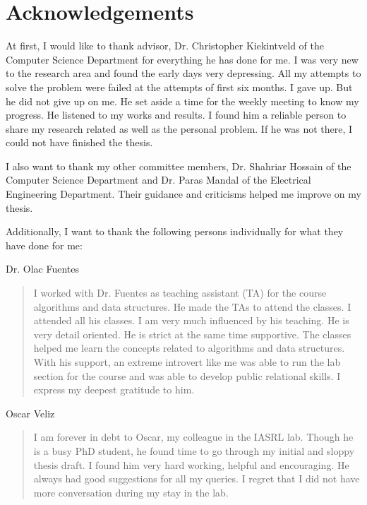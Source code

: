 

\chapter*{Acknowledgements}

At first, I would like to thank advisor, Dr. Christopher Kiekintveld of the Computer Science Department for everything he has done for me. I was very new to the research area and found the early days very depressing. All my attempts to solve the problem were failed at the attempts of first six months. I gave up. But he did not give up on me. He set aside a time for the weekly meeting to know my progress. He listened to my works and results. I found him a reliable person to share my research related as well as the personal problem. If he was not there, I could not have finished the thesis. 

I also want to thank my other committee members, Dr. Shahriar Hossain of 
the Computer Science Department and Dr. Paras Mandal of the Electrical Engineering Department. Their guidance and criticisms helped me improve on my thesis.

Additionally, I want to thank the following persons individually for what they have done for me:

\bigskip

\noindent
Dr. Olac Fuentes
\begin{quote}
 I worked with Dr. Fuentes as teaching assistant (TA) for the course algorithms and data structures. He made the TAs to attend the classes. I attended all his classes. I am very much influenced by his teaching. He is very detail oriented. He is strict at the same time supportive. The classes helped me learn the concepts related to algorithms and data structures. With his support, an extreme introvert like me was able to run the lab section for the course and was able to develop public relational skills. I express my deepest gratitude to him.
\end{quote}

\noindent
Oscar Veliz
\begin{quote}
  I am forever in debt to Oscar, my colleague in the IASRL lab. Though he is a busy PhD student, he found time to go through my initial and sloppy thesis draft. I found him very hard working, helpful and encouraging. He always had good suggestions for all my queries. I regret that I did not have more conversation during my stay in the lab.
\end{quote}

